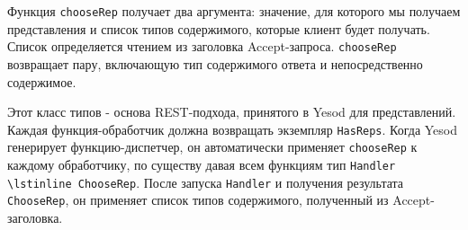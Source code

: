 Функция \lstinline `chooseRep` получает два аргумента: значение, для которого мы получаем представления и список типов содержимого, которые клиент будет получать. Список определяется чтением из заголовка Accept-запроса. \lstinline `chooseRep` возвращает пару, включающую тип содержимого ответа и непосредственно содержимое.

Этот класс типов - основа REST-подхода, принятого в Yesod для представлений. Каждая функция-обработчик должна возвращать экземпляр \lstinline `HasReps`. Когда Yesod генерирует функцию-диспетчер, он автоматически применяет \lstinline 'chooseRep' к каждому обработчику, по существу давая всем функциям тип \lstinline 'Handler \lstinline ChooseRep'. После  запуска \lstinline 'Handler' и получения результата \lstinline 'ChooseRep',  он применяет список типов содержимого, полученный из Accept-заголовка.




